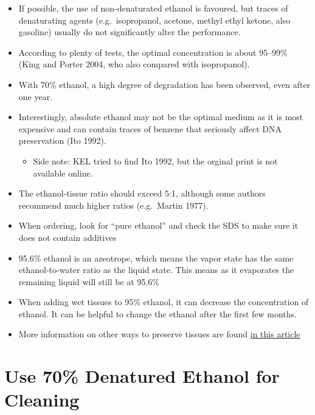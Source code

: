 \documentclass[
  letterpaper,
  DIV=11,
  numbers=noendperiod]{scrreprt}
\providecommand{\tightlist}{%
  \setlength{\itemsep}{0pt}\setlength{\parskip}{0pt}}\usepackage{longtable,booktabs,array}
\begin{document}
\begin{itemize}
\item
  If possible, the use of non-denaturated ethanol is favoured, but
  traces of denaturating agents (e.g.~isopropanol, acetone, methyl ethyl
  ketone, also gasoline) usually do not significantly alter the
  performance.
\item
  According to plenty of tests, the optimal concentration is about
  95--99\% (King and Porter 2004, who also compared with isopropanol).
\item
  With 70\% ethanol, a high degree of degradation has been observed,
  even after one year.
\item
  Interestingly, absolute ethanol may not be the optimal medium as it is
  most expensive and can contain traces of benzene that seriously affect
  DNA preservation (Ito 1992).

  \begin{itemize}
  \tightlist
  \item
    Side note: KEL tried to find Ito 1992, but the orginal print is not
    available online.
  \end{itemize}
\item
  The ethanol-tissue ratio should exceed 5:1, although some authors
  recommend much higher ratios (e.g.~Martin 1977).
\item
  When ordering, look for ``pure ethanol'' and check the SDS to make
  sure it does not contain additives
\item
  95.6\% ethanol is an azeotrope, which means the vapor state has the
  same ethanol-to-water ratio as the liquid state. This means as it
  evaporates the remaining liquid will still be at 95.6\%
\item
  When adding wet tissues to 95\% ethanol, it can decrease the
  concentration of ethanol. It can be helpful to change the ethanol
  after the first few months.
\item
  More information on other ways to preserve tissues are found
  \href{https://spnhc.biowikifarm.net/wiki/Tissue_Sample_Collection}{in
  this article}
\end{itemize}

\hypertarget{use-70-denatured-ethanol-for-cleaning}{%
\section*{\texorpdfstring{\textbf{Use 70\% Denatured Ethanol for
Cleaning}}{Use 70\% Denatured Ethanol for Cleaning}}\label{use-70-denatured-ethanol-for-cleaning}}
\end{document}
